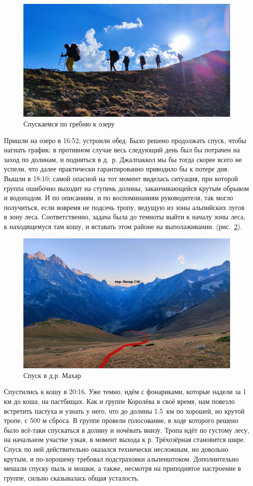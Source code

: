 \begin{figure}[h!]
	\centering
	\includegraphics[width=0.7\linewidth]{../pics/IMG_20240820_164917.jpg}
	\caption{Спускаемся по гребню к озеру}
	\label{fig:IMG_20240820_164917.jpg}
\end{figure}

Пришли на озеро в 16:52, устроили обед. Было решено продолжать спуск, чтобы нагнать график: в противном случае весь следующий день был бы потрачен на заход по долинам, и подняться в д.~р. Джалпаккол мы бы тогда скорее всего не успели, что далее практически гарантированно приводило бы к потере дня. Вышли в 18:10; самой опасной на тот момент виделась ситуация, при которой группа ошибочно выходит на ступень долины, заканчивающейся крутым обрывом и водопадом. И по описаниям, и по воспоминаниям руководителя, так могло получиться, если вовремя не подсечь тропу, ведущую из зоны альпийских лугов в зону леса. Соответственно, задача была до темноты выйти к началу зоны леса, к находящемуся там кошу, и вставать этом районе на выполаживании.  (рис.~\ref{fig:IMG_20240820_184645.jpg}).

\begin{figure}[h!]
	\centering
	\includegraphics[width=0.7\linewidth]{../pics/IMG_20240820_184645.jpg}
	\caption{Спуск в д.р. Махар}
	\label{fig:IMG_20240820_184645.jpg}
\end{figure}

Спустились к кошу в 20:16. Уже темно, идём с фонариками, которые надели за 1 км до коша, на пастбищах. Как и группе Королёва в своё время, нам повезло встретить пастуха и узнать у него, что до долины 1.5~км по хорошей, но крутой тропе, с 500 м сброса. В группе провели голосование, в ходе которого решено было всё-таки спускаться в долину и ночёвать внизу. Тропа идёт по густому лесу, на начальном участке узкая, в момент выхода к р. Трёхозёрная становится шире. Спуск по ней действительно оказался технически несложным, но довольно крутым, и по-хорошему требовал подстраховки альпенштоком. Дополнительно мешали спуску пыль и мошки, а также, несмотря на приподнятое настроение в группе, сильно сказывалась общая усталость.


